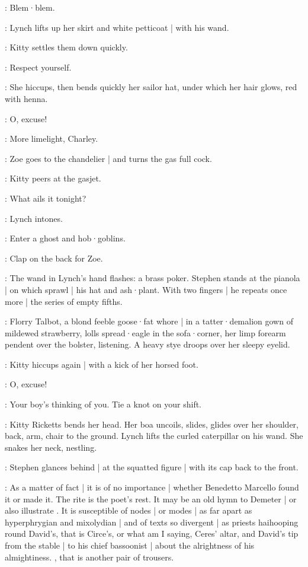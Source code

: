 \Kitty:
Blem·blem.

:
Lynch lifts up her skirt and white petticoat |
with his wand.

:
Kitty settles them down quickly.

\Kitty:
Respect yourself.

:
She hiccups,
then bends quickly her sailor hat,
under which her hair glows,
red with henna.

\Kitty:
O,
excuse!

\Zoe:
More limelight,
Charley.

:
Zoe goes to the chandelier |
and turns the gas full cock.

:
Kitty peers at the gasjet.

\Kitty:
What ails it tonight?

:
Lynch intones.

\Lynch:
Enter a ghost and hob·goblins.

\Zoe:
Clap on the back for Zoe.

:
The wand in Lynch's hand flashes:
a brass poker.
Stephen stands at the pianola |
on which sprawl |
his hat and ash·plant.
With two fingers |
he repeats once more |
the series of empty fifths.

:
Florry Talbot,
a blond feeble goose·fat whore |
in a tatter·demalion gown of mildewed strawberry,
lolls spread·eagle in the sofa·corner,
her limp forearm pendent over the bolster,
listening.
A heavy stye droops over her sleepy eyelid.

:
Kitty hiccups again |
with a kick of her horsed foot.

\Kitty:
O,
excuse!

\Zoe:
Your boy's thinking of you.
Tie a knot on your shift.

:
Kitty Ricketts bends her head.
Her boa uncoils,
slides,
glides over her shoulder,
back,
arm,
chair to the ground.
Lynch lifts the curled caterpillar on his wand.
She snakes her neck,
nestling.

:
Stephen glances behind |
at the squatted figure |
with its cap back to the front.

\Stephen:
As a matter of fact |
it is of no importance |
whether Benedetto Marcello found it or made it.
The rite is the poet's rest.
It may be an old hymn to Demeter |
or also illustrate .
It is susceptible of nodes |
or modes |
as far apart as hyperphrygian and mixolydian |
and of texts so divergent |
as priests haihooping round David's,
that is Circe's,
or what am I saying,
Ceres' altar,
and David's tip from the stable |
to his chief bassoonist |
about the alrightness of his almightiness.
,
that is another pair of trousers.

